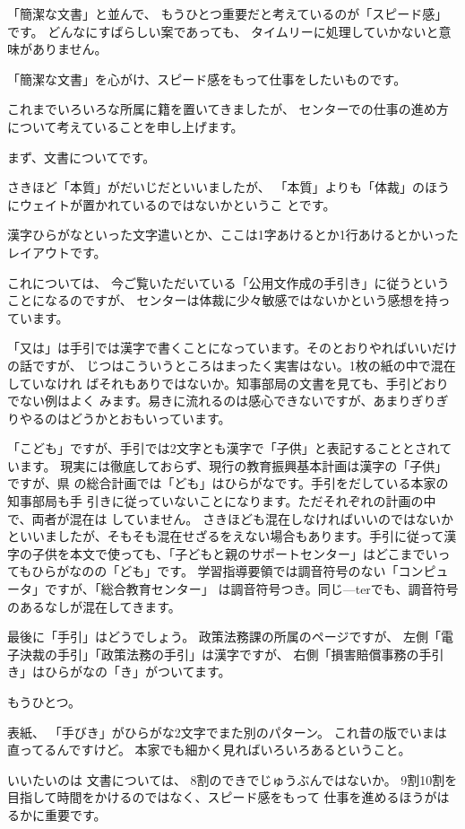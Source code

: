 \documentclass[uplatex,jis2004,dvipdfmx,12pt]{jsarticle}
\begin{document}
「簡潔な文書」と並んで、
もうひとつ重要だと考えているのが「スピード感」です。
どんなにすばらしい案であっても、
タイムリーに処理していかないと意味がありません。

「簡潔な文書」を心がけ、スピード感をもって仕事をしたいものです。

これまでいろいろな所属に籍を置いてきましたが、
センターでの仕事の進め方について考えていることを申し上げます。

まず、文書についてです。

さきほど「本質」がだいじだといいましたが、
「本質」よりも「体裁」のほうにウェイトが置かれているのではないかというこ
とです。


漢字ひらがなといった文字遣いとか、ここは1字あけるとか1行あけるとかいったレイアウトです。

これについては、
今ご覧いただいている「公用文作成の手引き」に従うということになるのですが、
センターは体裁に少々敏感ではないかという感想を持っています。

「又は」は手引では漢字で書くことになっています。そのとおりやればいいだけの話ですが、
じつはこういうところはまったく実害はない。1枚の紙の中で混在していなけれ
ばそれもありではないか。知事部局の文書を見ても、手引どおりでない例はよく
みます。易きに流れるのは感心できないですが、あまりぎりぎりやるのはどうかとおもいっています。


「こども」ですが、手引では2文字とも漢字で「子供」と表記することとされています。
現実には徹底しておらず、現行の教育振興基本計画は漢字の「子供」ですが、県
の総合計画では「ども」はひらがなです。手引をだしている本家の知事部局も手
引きに従っていないことになります。ただそれぞれの計画の中で、両者が混在は
していません。
さきほども混在しなければいいのではないかといいましたが、そもそも混在せざるをえない場合もあります。手引に従って漢字の子供を本文で使っても、「子どもと親のサポートセンター」はどこまでいってもひらがなのの「ども」です。
学習指導要領では調音符号のない「コンピュータ」ですが、「総合教育センター」
は調音符号つき。同じ---terでも、調音符号のあるなしが混在してきます。

最後に「手引」はどうでしょう。
政策法務課の所属のページですが、
左側「電子決裁の手引」「政策法務の手引」は漢字ですが、
右側「損害賠償事務の手引き」はひらがなの「き」がついてます。


もうひとつ。

表紙、
「手びき」がひらがな2文字でまた別のパターン。
これ昔の版でいまは直ってるんですけど。
本家でも細かく見ればいろいろあるということ。

いいたいのは
文書については、
8割のできでじゅうぶんではないか。
9割10割を目指して時間をかけるのではなく、スピード感をもって
仕事を進めるほうがはるかに重要です。
\end{document}
